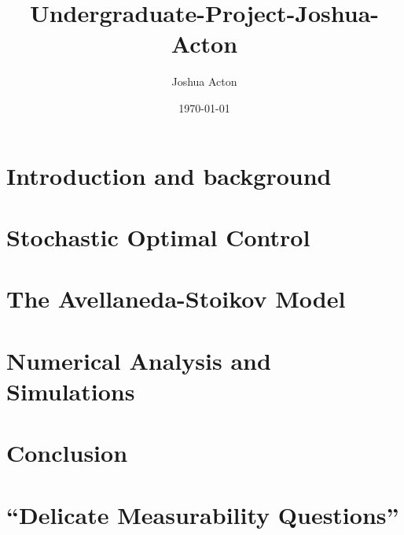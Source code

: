 \documentclass[11pt,twoside]{report}
\title{Undergraduate-Project-Joshua-Acton}
\author{Joshua Acton}
\date{\today}
\theoremstyle{definition}
\theoremstyle{remark}
\begin{document}


%

%

%



\tableofcontents

\newpage
{}
\listoffigures

\chapter{Introduction and background}\label{chap:1}


\chapter{Stochastic Optimal Control}\label{chap:2}


\chapter{The Avellaneda-Stoikov Model}\label{chap:3}


%

\chapter{Numerical Analysis and Simulations}


\chapter{Conclusion}


\printbibliography[heading=bibintoc]

\appendix
\chapter{``Delicate Measurability Questions''}

\end{document}
